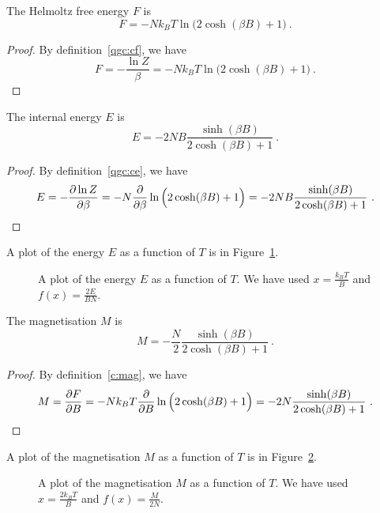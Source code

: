     The Helmoltz free energy $F$ is 
    \begin{equation*}
        F = - N k_B T \ln \Big ( 2 \cosh (\beta B) + 1 \Big) ~.
    \end{equation*}
    \begin{proof}
        By definition~\eqref{qgc:cf}, we have
        \begin{equation*}
            F = - \frac{\ln Z}{\beta} = - N k_B T \ln \Big ( 2 \cosh (\beta B) + 1 \Big) ~.
        \end{equation*}
    \end{proof}

    The internal energy $E$ is 
    \begin{equation*}
        E = - 2 N B \frac{\sinh (\beta B)}{2 \cosh (\beta B) + 1} ~.
    \end{equation*}
    \begin{proof}
        By definition~\eqref{qgc:ce}, we have
        \begin{equation*}
            E = - \frac{\partial\ln Z}{\partial\beta} = - N \frac{\partial}{\partial\beta} \ln \Big ( 2 \cosh (\beta B) + 1 \Big) = - 2 N B \frac{\sinh (\beta B)}{2 \cosh (\beta B) + 1} ~.
        \end{equation*}
    \end{proof}
    A plot of the energy $E$ as a function of $T$ is in Figure~\ref{qm:e1}.
    \begin{figure}
        \centering
        \caption{A plot of the energy $E$ as a function of $T$. We have used $x = \frac{k_B T}{B} $ and $f(x) = \frac{2E}{BN}$.}
        \label{qm:e1}
    \end{figure}

    The magnetisation $M$ is 
    \begin{equation*}
        M = - \frac{N}{2} \frac{\sinh (\beta B)}{2 \cosh (\beta B) + 1} ~. 
    \end{equation*}
    \begin{proof}
        By definition~\eqref{c:mag}, we have
        \begin{equation*}
            M = \frac{\partial F}{\partial B} = - N k_B T \frac{\partial}{\partial B} \ln \Big ( 2 \cosh (\beta B) + 1 \Big) = - 2 N \frac{\sinh (\beta B)}{2 \cosh (\beta B) + 1}  ~.
        \end{equation*}
    \end{proof}
    A plot of the magnetisation $M$ as a function of $T$ is in Figure~\ref{qm:m2}.
    \begin{figure}
        \centering
        \caption{A plot of the magnetisation $M$ as a function of $T$. We have used $x = \frac{2 k_B T}{B} $ and $f(x) = \frac{M}{2N}$.}
        \label{qm:m2}
    \end{figure}

